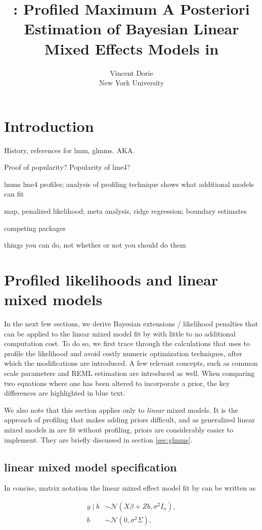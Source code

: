 \documentclass[article,shortnames]{jss}
\author{Vincent Dorie\\New York University}
\title{\pkg{blme}: Profiled Maximum A Posteriori Estimation of
  Bayesian Linear Mixed Effects Models in \proglang{R}}
\begin{document}
\section[Introduction]{Introduction}

History, references for lmm, glmms. AKA.

Proof of popularity? Popularity of lme4?

lmms lme4 profiles; analysis of profiling technique shows what
additional models can fit

map, penalized likelihood; meta analysis, ridge regression; boundary estimates

competing packages

things you can do, not whether or not you should do them

\section[Profiled likelihood and lme4]{Profiled likelihoods and linear
  mixed models}

In the next few sections, we derive Bayesian extensions / likelihood penalties that
can be applied to the linear mixed model fit by  with little to no
additional computation cost. To do so, we first trace through the
calculations that  uses to profile the likelihood and avoid
costly numeric optimization techniques, after which the modifications
are introduced. A few relevant concepts, such as common scale parameters and
REML estimation are introduced as well. When comparing two equations where one has
been altered to incorporate a prior, the key differences are highlighted in
{\color{blue}blue} text.

We also note that this section applies only
to {\em linear} mixed models. It is the approach of profiling that
makes adding priors difficult, and as generalized linear mixed models
in  are fit without profiling, priors are considerably easier to
implement. They are briefly discussed in section \ref{sec:glmms}.

\subsection[lme4 linear mixed model specification]{ linear mixed model specification}

In concise, matrix notation the linear mixed effect model fit by  can be written as

\begin{align}
  \label{eq:conditionalModel}
  y\mid b & \sim \mathcal{N}(X\beta + Zb, \sigma^2 I_n), \nonumber \\
  b & \sim \mathcal{N}(0, \sigma^2\Sigma),
\end{align}
\end{document}
